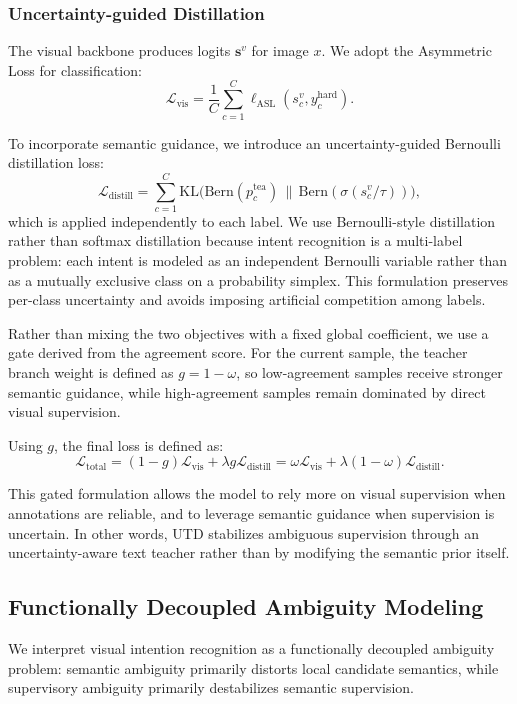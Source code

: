 \subsubsection{Uncertainty-guided Distillation}

The visual backbone produces logits $\mathbf{s}^{v}$ for image $x$. We adopt the Asymmetric Loss \cite{ridnik_asymmetric_2021} for classification:
\begin{equation}
\mathcal{L}_{\text{vis}} = \frac{1}{C} \sum_{c=1}^{C} \ell_{\text{ASL}}(s^{v}_{c}, y^{\text{hard}}_{c}).
\end{equation}

To incorporate semantic guidance, we introduce an uncertainty-guided Bernoulli distillation loss:
\begin{equation}
\mathcal{L}_{\text{distill}} = \sum_{c=1}^{C}\text{KL}\big(\mathrm{Bern}(p_c^{\text{tea}})\,\|\, \mathrm{Bern}(\sigma(s_c^{v}/\tau))\big),
\end{equation}
which is applied independently to each label. We use Bernoulli-style distillation rather than softmax distillation because intent recognition is a multi-label problem: each intent is modeled as an independent Bernoulli variable rather than as a mutually exclusive class on a probability simplex. This formulation preserves per-class uncertainty and avoids imposing artificial competition among labels.

Rather than mixing the two objectives with a fixed global coefficient, we use a gate derived from the agreement score. For the current sample, the teacher branch weight is defined as $g = 1 - \omega$, so low-agreement samples receive stronger semantic guidance, while high-agreement samples remain dominated by direct visual supervision.

Using $g$, the final loss is defined as:
\begin{equation}
\mathcal{L}_{\text{total}} = (1-g)\mathcal{L}_{\text{vis}} + \lambda g \mathcal{L}_{\text{distill}}
= \omega \mathcal{L}_{\text{vis}} + \lambda (1-\omega)\mathcal{L}_{\text{distill}}.
\end{equation}

This gated formulation allows the model to rely more on visual supervision when annotations are reliable, and to leverage semantic guidance when supervision is uncertain. In other words, UTD stabilizes ambiguous supervision through an uncertainty-aware text teacher rather than by modifying the semantic prior itself.

\subsection{Functionally Decoupled Ambiguity Modeling}
\label{sec:decoupling_principle}
We interpret visual intention recognition as a functionally decoupled ambiguity problem: semantic ambiguity primarily distorts local candidate semantics, while supervisory ambiguity primarily destabilizes semantic supervision.

